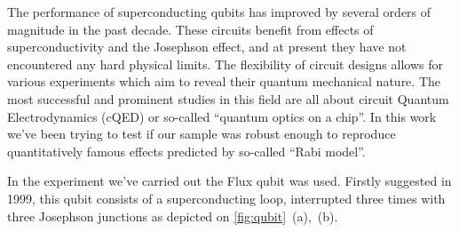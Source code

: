 \documentclass[a0, portrait]{a0poster}
\begin{document}
\vspace{-1.5cm}
\begin{multicols}{2}							%
\raggedcolumns							%


\begin{tcolorbox}[left=1cm, right=1cm, top=0.5cm, bottom=0.5cm, 
                  title={\Large Introduction}, bottomtitle=.5cm,toptitle=.5cm]

The performance of superconducting qubits has improved by several orders of magnitude in the past decade. These circuits benefit from effects of superconductivity and the Josephson effect, and at present they have not encountered any hard physical limits. The flexibility of circuit designs allows for various experiments which aim to reveal their quantum mechanical nature. The most successful and prominent studies\cite{bishop2009} in this field are all about circuit Quantum Electrodynamics (cQED) or so-called ``quantum optics on a chip''. In this work we've been trying to test if our sample was robust enough to reproduce quantitatively famous effects predicted by so-called ``Rabi model''.
\end{tcolorbox}

\begin{tcolorbox}[left=1cm, right=1cm, top=0.5cm, bottom=0.5cm, 
                  title={\Large Flux qubit}, bottomtitle=.3cm, toptitle=.5cm
                  ]

In the experiment we've carried out the Flux qubit was used. Firstly suggested in 1999, this qubit consists of a superconducting loop, interrupted three times with three Josephson junctions as depicted on \autoref{fig:qubit}~(a),~(b).\\


\end{tcolorbox}
\end{multicols}
\end{document}
